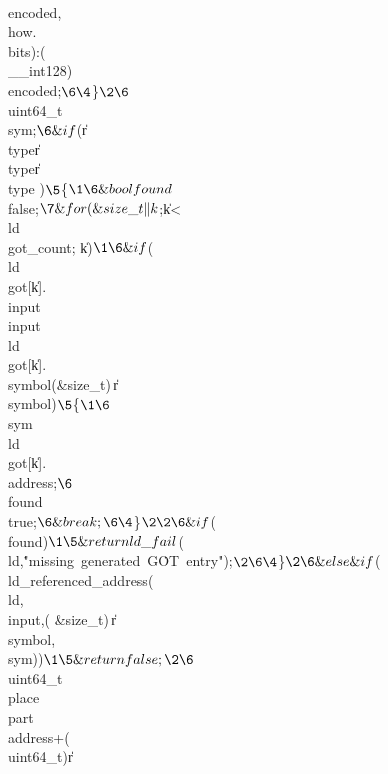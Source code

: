 \\{encoded},\\{how}.\\{bits}):(\\{\_\_int128})\\{encoded};{}$\6
\4${}\}{}$\2\6
${}\\{uint64\_t}\\{sym}\K{};{}$\6
\&{if} ${}(\|r\MG\\{type}\E{}\V\|r\MG\\{type}\E{}\V\|r\MG\\{type}\E%
){}$\5
${}\{{}$\1\6
\&{bool} \\{found}${}\K\\{false};{}$\7
\&{for} (\&{size\_t} \|k${}\K{};{}$ ${}\|k<\\{ld}\MG\\{got\_count};{}$ ${}%
\|k\PP){}$\1\6
\&{if} ${}(\\{ld}\MG\\{got}[\|k].\\{input}\E\\{input}\W\\{ld}\MG\\{got}[\|k].%
\\{symbol}\E(\&{size\_t})\,\|r\MG\\{symbol}){}$\5
${}\{{}$\1\6
${}\\{sym}\K\\{ld}\MG\\{got}[\|k].\\{address};{}$\6
${}\\{found}\K\\{true};{}$\6
\&{break};\6
\4${}\}{}$\2\2\6
\&{if} ${}(\R\\{found}){}$\1\5
\&{return} \\{ld\_fail}${}(\\{ld},\.{"missing\ generated\ G}\)\.{OT\
entry"});{}$\2\6
\4${}\}{}$\2\6
\&{else} \&{if} ${}(\R\\{ld\_referenced\_address}(\\{ld},\\{input},(%
\&{size\_t})\,\|r\MG\\{symbol},\39{\AND}\\{sym})){}$\1\5
\&{return} \\{false};\2\6
${}\\{uint64\_t}\\{place}\K\\{part}\MG\\{address}+(\\{uint64\_t})\|r\MG%
